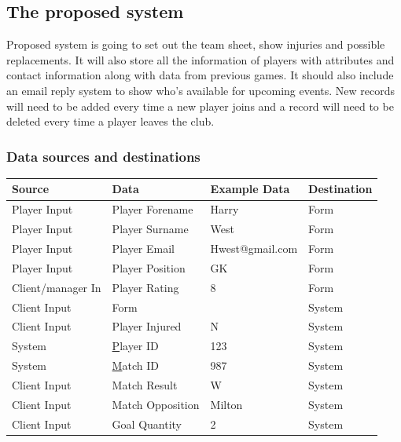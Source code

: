 \subsection{The proposed system}
Proposed system is going to set out the team sheet, show injuries and possible replacements. It will also store all the information of players with attributes and contact information along with data from previous games. It should also include an email reply system to show who's available for upcoming events. New records will need to be added every time a new player joins and a record will need to be deleted every time a player leaves the club.

\subsubsection{Data sources and destinations}

\begin{table}[H]
\centering
\begin{tabular}{|l|l|l|l|}
\hline
Source               & Data             & Example Data    & Destination \\ \hline
Player Input         & Player Forename  & Harry           & Form        \\ \hline
Player Input         & Player Surname   & West            & Form        \\ \hline
Player Input         & Player Email     & Hwest@gmail.com & Form        \\ \hline
Player Input         & Player Position  & GK              & Form        \\ \hline
Client/manager In    & Player Rating    & 8               & Form        \\ \hline
Client Input         & Form             &                 & System      \\ \hline
Client Input         & Player Injured   & N               & System      \\ \hline
System               & {\ul Player ID}  & 123             & System      \\ \hline
System               & {\ul Match ID}   & 987             & System      \\ \hline
Client Input         & Match Result     & W               & System      \\ \hline
Client Input         & Match Opposition & Milton          & System      \\ \hline
Client Input         & Goal Quantity    & 2               & System      \\ \hline
\end{tabular}
\end{table}

